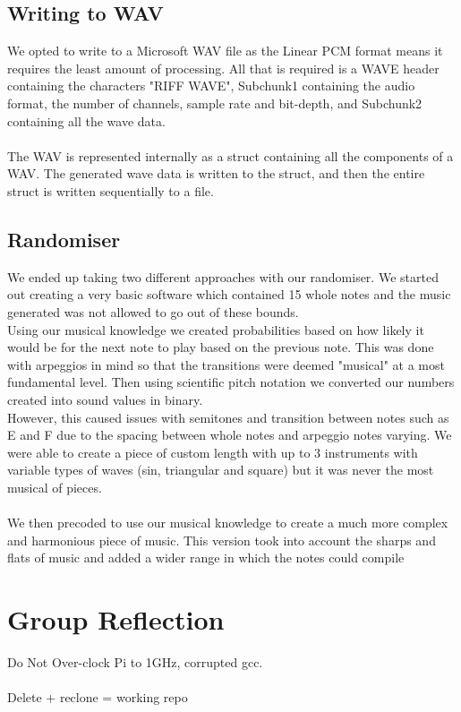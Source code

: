 \documentclass[11pt]{article}
\begin{document}
\subsection{Writing to WAV}
We opted to write to a Microsoft WAV file as the Linear PCM format means it requires the least amount of processing. All that is required is a WAVE header containing the characters "RIFF WAVE", Subchunk1 containing the audio format, the number of channels, sample rate and bit-depth, and Subchunk2 containing all the wave data.
\\\\
The WAV is represented internally as a struct containing all the components of a WAV. The generated wave data is written to the struct, and then the entire struct is written sequentially to a file.

\subsection{Randomiser}
We ended up taking two different approaches with our randomiser. We started out creating a very basic software which contained 15 whole notes and the music generated was not allowed to go out of these bounds. 
\\
Using our musical knowledge we created probabilities based on how likely it would be for the next note to play based on the previous note. This was done with arpeggios in mind so that the transitions were deemed "musical" at a most fundamental level. Then using scientific pitch notation we converted our numbers created into sound values in binary.
\\
However, this caused issues with semitones and transition between notes such as E and F due to the spacing between whole notes and arpeggio notes varying. We were able to create a piece of custom length with up to 3 instruments with variable types of waves (sin, triangular and square) but it was never the most musical of pieces.
\\\\
We then precoded to use our musical knowledge to create a much more complex and harmonious piece of music. This version took into account the sharps and flats of music and added a wider range in which the notes could compile

\section{Group Reflection}

Do Not Over-clock Pi to 1GHz, corrupted gcc.
\\\\
Delete + reclone = working repo
\end{document}
